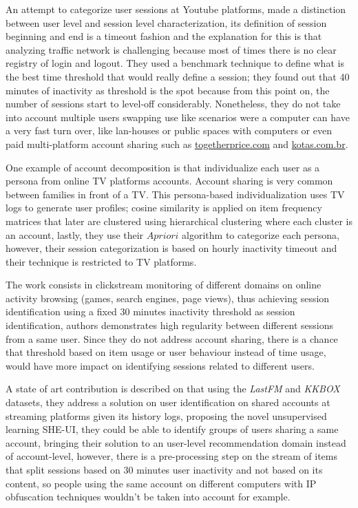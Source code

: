 \documentclass[ecp,tc,english]{iiufrgs}
\begin{document}
An attempt to categorize user sessions at Youtube platforms, \cite{gill2008} made a distinction between user level and session level characterization, its definition of session beginning and end is a timeout fashion and the explanation for this is that analyzing traffic network is challenging because most of times there is no clear registry of login and logout. They used a benchmark technique to define what is the best time threshold that would really define a session; they found out that 40 minutes of inactivity as threshold is the spot because from this point on, the number of sessions start to level-off considerably.
Nonetheless, they do not take into account multiple users swapping use like scenarios were a computer can have a very fast turn over, like lan-houses or public spaces with computers or even paid multi-platform account sharing such as \url{togetherprice.com} and \url{kotas.com.br}.

One example of account decomposition is \cite{bajaj2016} that individualize each user as a  persona from online TV platforms accounts. Account sharing is very common between families  in front of a TV. This persona-based individualization uses TV logs to generate user profiles; cosine similarity is applied on item frequency matrices that later are clustered using hierarchical clustering where each cluster is an account, lastly, they use their \(Apriori\) algorithm to categorize each persona, however, their session categorization is based on hourly inactivity timeout and their technique is restricted to TV platforms.

The work \cite{halfaker2015} consists in clickstream monitoring of different domains on online activity browsing (games, search engines, page views), thus achieving session identification using a fixed 30 minutes inactivity threshold as session identification, authors demonstrates high regularity between different sessions from a same user. 
Since they do not address account sharing, there is a chance that threshold based on item usage or user behaviour instead of time usage, would have more impact on identifying sessions related to different users.

A state of art contribution is described on \cite{jiang2018} that using the \textit{LastFM} and \textit{KKBOX} datasets, they address a solution on user identification on shared accounts at streaming platforms given its history logs, proposing the novel unsupervised learning SHE-UI, they could be able to identify groups of users sharing a same account, bringing their solution to an user-level recommendation domain instead of account-level, however, there is a pre-processing step on the stream of items that split sessions based on 30 minutes user inactivity and not based on its content, so people using the same account on different computers with IP obfuscation techniques wouldn't be taken into account for example.
\end{document}
